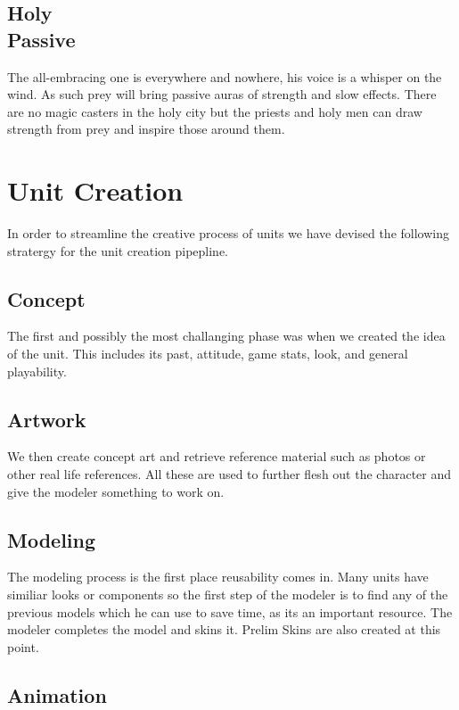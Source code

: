 \documentclass[a4paper,twocolumn]{article}
\begin{document}
\subsection{Holy \\ Passive}

The all-embracing one is everywhere and nowhere, his voice is a whisper on the wind. As such prey will bring passive auras of strength and slow effects. There are no magic casters in the holy city but the priests and holy men can draw strength from prey and inspire those around them.


\newpage \section{Unit Creation}

In order to streamline the creative process of units we have devised the following stratergy for the unit creation pipepline.

\subsection{Concept}

The first and possibly the most challanging phase was when we created the idea of the unit. This includes its past, attitude, game stats, look, and general playability.

\subsection{Artwork}

We then create concept art and retrieve reference material such as photos or other real life references. All these are used to further flesh out the character and give the modeler something to work on.

\subsection{Modeling}

The modeling process is the first place reusability comes in. Many units have similiar looks or components so the first step of the modeler is to find any of the previous models which he can use to save time, as its an important resource. The modeler completes the model and skins it. Prelim Skins are also created at this point.

\subsection{Animation}
\end{document}
